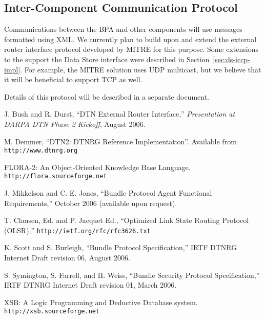 \documentclass[11pt]{article}
\begin{document}




%
\subsection{Inter-Component Communication Protocol} \label{sec:iccp}

Communications between the BPA and other components will use messages
formatted using XML.  We currently plan to build upon and extend the 
external router interface protocol developed by MITRE for this purpose.  
Some extensions to the support the Data Store interface were described in 
Section~\ref{sec:ds-iccp-impl}.  For example, the MITRE solution 
uses UDP multicast, but we believe that it will be beneficial to 
support TCP as well.

Details of this protocol will be described in a separate document.

\newpage
\begin{thebibliography}{99}


 J. Bush and R. Durst, ``DTN External Router Interface,''
{\em Presentation at DARPA DTN Phase 2 Kickoff}, August 2006.

 M. Demmer, ``DTN2: DTNRG Reference Implementation''. Available
from {\tt http://www.dtnrg.org}

 FLORA-2: An Object-Oriented Knowledge Base Language.
{\tt http://flora.sourceforge.net}

 J. Mikkelson and C. E. Jones, ``Bundle Protocol Agent Functional
Requirements,'' October 2006 (available upon request).

 T. Clausen, Ed. and P. Jacquet Ed., ``Optimized Link State 
Routing Protocol (OLSR),'' {\tt http://ietf.org/rfc/rfc3626.txt}

 K. Scott and S. Burleigh, ``Bundle Protocol Specification,''
IRTF DTNRG Internet Draft revision 06, August 2006.

 S. Symington, S. Farrell, and H. Weiss, ``Bundle Security
Protocol Specification,'' IRTF DTNRG Internet Draft revision 01, March 2006.

 XSB: A Logic Programming and Deductive Database system.
{\tt http://xsb.sourceforge.net}

\end{thebibliography}

\end{document}
